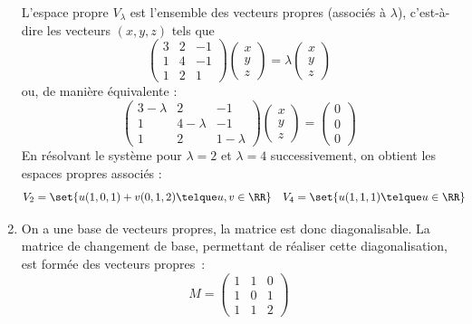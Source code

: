 \documentclass[12pt,french,oneside,a4paper]{memoir} %
\begin{document}
\begin{exo}
\begin{correction}
\begin{enumerate}
  L'espace propre $V_{\lambda}$ est l'ensemble des vecteurs propres (associés à $\lambda$), c'est-à-dire les vecteurs $(x,y,z)$ tels que
  \begin{equation*}
    \begin{pmatrix}
      3 &2 &-1 \\
      1 &4 &-1 \\
      1 &2 &1
    \end{pmatrix}
    \begin{pmatrix}
      x\\y\\z
    \end{pmatrix} = \lambda
    \begin{pmatrix}
      x\\y\\z
    \end{pmatrix}
  \end{equation*}
  ou, de manière équivalente :
  \begin{equation*}
    \begin{pmatrix}
      3-\lambda &2 &-1 \\
      1 &4-\lambda &-1 \\
      1 &2 &1-\lambda
    \end{pmatrix}
    \begin{pmatrix}
      x\\y\\z
    \end{pmatrix} = 
    \begin{pmatrix}
      0\\0\\0
    \end{pmatrix}
  \end{equation*}
En résolvant le système pour $\lambda = 2$ et $\lambda = 4$ successivement, on obtient les espaces propres associés : 
\begin{align*}
  V_{2} &= \set{ u (1, 0, 1) + v (0,1,2) \telque u,v\in\RR }&
  V_{4} &= \set{ u (1, 1, 1) \telque u \in \RR }
\end{align*}
\item On a une base de vecteurs propres, la matrice est donc diagonalisable. La matrice de changement de base, permettant de réaliser cette diagonalisation, est formée des vecteurs propres~:
  \begin{equation*}
M =    \begin{pmatrix}
      1&1&0\\
      1&0&1\\
      1&1&2
    \end{pmatrix}

\end{equation*}
\end{enumerate}
\end{correction}
\end{exo}
\end{document}
